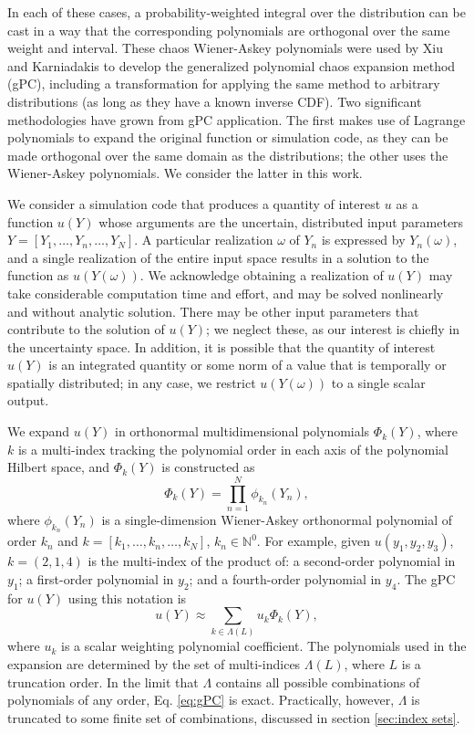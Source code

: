 In each of these cases, a probability-weighted
integral over the distribution can be cast in a way that the corresponding polynomials are orthogonal over the
same weight and interval.  These chaos Wiener-Askey polynomials were used by Xiu and Karniadakis to develop
the generalized polynomial chaos expansion method (gPC), including a transformation for applying the same
method to arbitrary distributions (as long as they have a known inverse CDF)\cite{xiu}.  Two significant
methodologies have grown from gPC application.  The first makes use of Lagrange polynomials to expand the
original function or simulation code, as they can be made orthogonal over the same domain as the
distributions\cite{SCLagrange}; the other uses the Wiener-Askey polynomials\cite{xiu}.  We consider the latter in this work.

We consider a simulation code that produces a quantity of interest $u$ as a function $u(Y)$ whose arguments are
the uncertain, distributed input
parameters $Y=[Y_1,\ldots,Y_n,\ldots,Y_N]$.  A particular realization $\omega$ of $Y_n$ is expressed by
$Y_n(\omega)$, and a single realization of the entire input space results in a solution to the function as
$u(Y(\omega))$.  We acknowledge obtaining a realization of $u(Y)$ may take considerable computation time and
effort, and may be solved nonlinearly and without analytic solution.  There may be other input parameters that
contribute to the solution of $u(Y)$; we neglect these, as our interest is chiefly in the uncertainty space.
In addition, it is possible that the quantity of interest $u(Y)$ is an integrated quantity or some norm of a
value that is temporally or spatially distributed; in any case, we restrict $u(Y(\omega))$ to a single scalar
output.

We expand $u(Y)$ in orthonormal multidimensional polynomials $\Phi_k(Y)$, where $k$ is a multi-index tracking
the polynomial order in each axis of the polynomial Hilbert space, and $\Phi_k(Y)$ is constructed as
\begin{equation}\label{eq:gPC}
  \Phi_k(Y) = \prod_{n=1}^N \phi_{k_n}(Y_n),
\end{equation}
where $\phi_{k_n}(Y_n)$ is a single-dimension Wiener-Askey orthonormal polynomial of order $k_n$ and
$k=[k_1,\ldots,k_n,\ldots,k_N]$, $k_n\in\mathbb{N}^0$.  For example, given $u(y_1,y_2,y_3)$, $k=(2,1,4)$ 
is the multi-index of the
product of: a second-order polynomial in $y_1$; a first-order polynomial in $y_2$; and a fourth-order
polynomial in $y_4$. The gPC for $u(Y)$ using this notation is
\begin{equation}
  u(Y) \approx \sum_{k\in\Lambda(L)} u_k\Phi_k(Y),
\end{equation}
where $u_k$ is a scalar weighting polynomial coefficient. The polynomials used in the expansion are determined
by the set of multi-indices $\Lambda(L)$, where $L$ is a truncation order.  In the limit
that $\Lambda$ contains all possible combinations of polynomials of any order, Eq. \ref{eq:gPC} is exact.
Practically, however, $\Lambda$ is truncated to some finite set of combinations, discussed in section
\ref{sec:index sets}.

